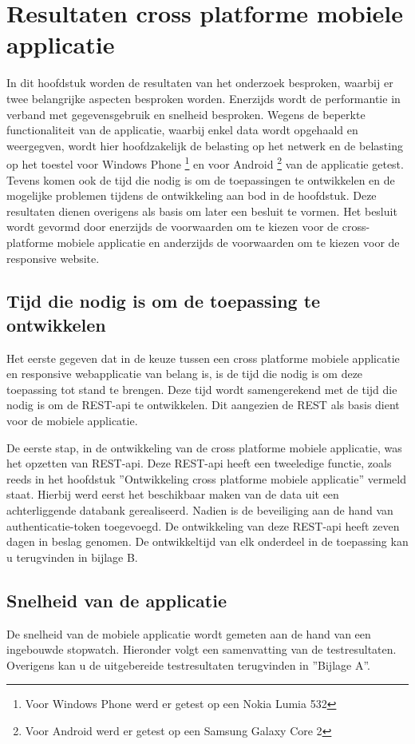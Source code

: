 \chapter{Resultaten cross platforme mobiele applicatie}
\label{ch:resultatencrossplatformapp}
In dit hoofdstuk worden de resultaten van het onderzoek besproken, waarbij er twee belangrijke
aspecten besproken worden.
Enerzijds wordt de performantie in verband met gegevensgebruik en  snelheid besproken.
Wegens de beperkte functionaliteit van de applicatie, waarbij enkel data wordt opgehaald en weergegven, wordt hier hoofdzakelijk de
belasting op het netwerk en de belasting op het toestel voor Windows Phone \footnote{Voor Windows Phone werd er getest op een Nokia Lumia 532} en voor Android \footnote{Voor Android werd er getest op een Samsung Galaxy Core 2} van de applicatie getest.
Tevens komen ook de tijd die nodig is om de toepassingen te ontwikkelen en de mogelijke
problemen tijdens de ontwikkeling aan bod in de hoofdstuk.
Deze resultaten dienen overigens als basis om later een besluit te vormen.
Het besluit wordt gevormd door enerzijds de voorwaarden om te kiezen voor de
cross-platforme mobiele applicatie en anderzijds de voorwaarden om te kiezen voor de responsive website.

\section{Tijd die nodig is om de toepassing te ontwikkelen}
Het eerste gegeven dat in de keuze tussen een cross platforme mobiele
applicatie en responsive webapplicatie van belang is,
is de tijd die nodig is om deze toepassing tot stand te brengen.
Deze tijd wordt samengerekend met de tijd die nodig is om de
REST-api te ontwikkelen. Dit aangezien de REST als basis dient voor de mobiele applicatie.

De eerste stap, in de ontwikkeling van de cross platforme mobiele applicatie, was het opzetten van REST-api.
Deze REST-api heeft een tweeledige functie, zoals reeds in het hoofdstuk ''Ontwikkeling cross platforme mobiele applicatie'' vermeld staat.
Hierbij werd eerst het beschikbaar maken van de data uit een achterliggende databank gerealiseerd. Nadien is de beveiliging aan de hand
van authenticatie-token toegevoegd. De ontwikkeling van deze REST-api heeft zeven dagen in beslag genomen. De ontwikkeltijd van elk onderdeel
in de toepassing kan u terugvinden in bijlage B.

\section{Snelheid van de applicatie}
De snelheid van de mobiele applicatie wordt gemeten aan de hand van een ingebouwde stopwatch.
Hieronder volgt een samenvatting van de testresultaten. Overigens kan u de uitgebereide testresultaten terugvinden in ''Bijlage A''.

